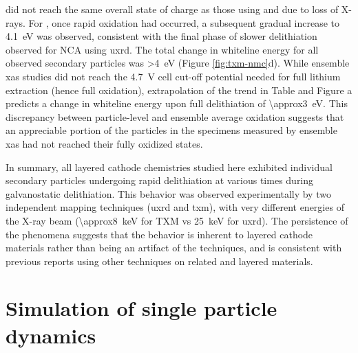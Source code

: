 \documentclass{article}
\begin{document}
\nmc[532]{} did not reach the same overall state of charge as those
using \nmc[333]{} and \nca{} due to loss of X-rays. For \nmc[333]{},
once rapid oxidation had occurred, a subsequent gradual increase to
\SI{4.1}{eV} was observed, consistent with the final phase of slower
delithiation observed for NCA using \gls{uxrd}. The total change in
whiteline energy for all observed secondary particles was \SI{>4}{eV}
(Figure \ref{fig:txm-nmc}d). While ensemble \gls{xas}
studies\cite{deb2005,muto2009} did not reach the \SI{4.7}{V} cell
cut-off potential needed for full lithium extraction (hence full
 oxidation), extrapolation of the trend in Table
 and Figure
a predicts a change in whiteline
energy upon full delithiation of \SI{\approx3}{eV}. This discrepancy
between particle-level and ensemble average  oxidation suggests
that an appreciable portion of the particles in the specimens measured
by ensemble \gls{xas} had not reached their fully oxidized states.

In summary, all layered cathode chemistries studied here exhibited
individual secondary particles undergoing rapid delithiation at
various times during galvanostatic delithiation. This behavior was
observed experimentally by two independent mapping techniques
(\gls{uxrd} and \gls{txm}), with very different energies of the X-ray beam
(\SI{\approx8}{\kilo\electronvolt} for TXM vs
\SI{25}{\kilo\electronvolt} for \gls{uxrd}). The persistence of the
phenomena suggests that the behavior is inherent
to layered cathode materials rather than being an artifact of the
techniques, and is consistent with previous reports using other
techniques on related \nmc{} and  layered
materials\cite{chueh2021,rao2021,wang2020-6}.


\section{Simulation of single particle dynamics}

\end{document}
